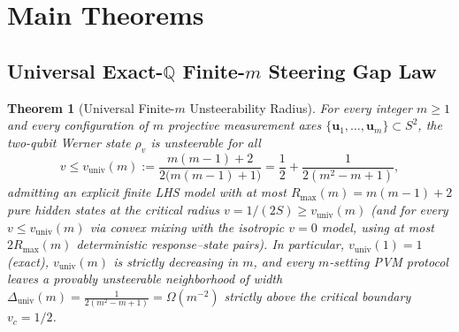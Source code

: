 \documentclass[11pt,a4paper]{article}
\newtheorem{theorem}{Theorem}[section]
\theoremstyle{definition}
\theoremstyle{remark}
\newcommand{\QQ}{\mathbb{Q}}
\begin{document}
\section{Main Theorems}

\subsection{Universal Exact-\texorpdfstring{$\QQ$}{Q} Finite-\texorpdfstring{$m$}{m} Steering Gap Law}

\begin{theorem}[Universal Finite-$m$ Unsteerability Radius]\label{thm:univ-gap}
For every integer $m \ge 1$ and \emph{every} configuration of $m$ projective measurement axes $\{\mathbf{u}_1,\dots,\mathbf{u}_m\} \subset S^2$, the two-qubit Werner state $\rho_v$ is unsteerable for all
\begin{equation}\label{eq:univ-gap}
  v \le v_{\mathrm{univ}}(m) := \frac{m(m-1) + 2}{2\bigl(m(m-1) + 1\bigr)} = \frac{1}{2} + \frac{1}{2(m^2 - m + 1)},
\end{equation}
admitting an explicit finite LHS model with at most $R_{\max}(m) = m(m-1) + 2$ pure hidden states at the critical radius $v = 1/(2S) \ge v_{\mathrm{univ}}(m)$ (and for every $v \le v_{\mathrm{univ}}(m)$ via convex mixing with the isotropic $v=0$ model, using at most $2 R_{\max}(m)$ deterministic response--state pairs).
In particular, $v_{\mathrm{univ}}(1) = 1$ (exact), $v_{\mathrm{univ}}(m)$ is strictly decreasing in $m$, and every $m$-setting PVM protocol leaves a provably unsteerable neighborhood of width $\Delta_{\mathrm{univ}}(m) = \frac{1}{2(m^2-m+1)} = \Omega(m^{-2})$ strictly above the critical boundary $v_c = 1/2$.
\end{theorem}
\end{document}
